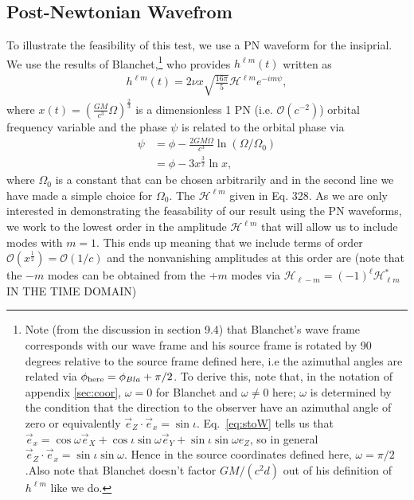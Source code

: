 \documentclass[aps,prd,amsmath,showpacs,amssymb,superscriptaddress,nofootinbib,longbibliography,eqsecnum,preprintnumbers]{revtex4-1}
\begin{document}
\subsection{Post-Newtonian Wavefrom}
To illustrate the feasibility of this test, we use a PN waveform for the insiprial.
We use the results of Blanchet,\footnote{Note (from the discussion in section 9.4) that Blanchet's wave frame corresponds with our wave frame and his source frame is rotated by 90 degrees relative to the source frame defined here, i.e the azimuthal angles are related via $\phi_{\rm here} =\phi_{Bla}+\pi/2$. To derive this, note that, in the notation of appendix \ref{sec:coor}, $\omega =0$ for Blanchet and $\omega\neq 0$ here; $\omega$ is determined by the condition that the direction to the observer have an azimuthal angle of zero or equivalently $\vec e_Z \cdot \vec e_x =\sin \iota$. Eq.~\eqref{eq:stoW} tells us that $\vec e_x =\cos \omega \vec e_X +\cos \iota \sin\omega \vec e_Y +\sin \iota \sin \omega e_Z$, so in general $\vec e_Z \cdot \vec e_x =\sin\iota \sin\omega$. Hence in the source coordinates defined here, $\omega =\pi/2$.Also note that Blanchet doesn't factor $GM/(c^2d)$ out of his definition of $h^{\ell m}$ like we do.}  
who provides $h^{\ell m}(t)$ written as
\begin{align}
h^{\ell m}(t)=2\nu x\sqrt{\frac{16\pi}{5}}\mathcal{H}^{\ell m}e^{-im\psi},
\end{align}
where $x(t)=\left(\frac{GM}{c^3}\Omega\right)^\frac{2}{3}$ is a dimensionless 1 PN (i.e. $\mathcal{O}(c^{-2})$) orbital frequency variable and the phase $\psi$ is related to the orbital phase via
\begin{align}
\psi&=\phi-\frac{2GM\Omega}{c^3}\ln(\Omega/\Omega_0) \nonumber \\
&=\phi-3x^\frac{3}{2}\ln x, \label{eq:pha}
\end{align}
where $\Omega_0$ is a constant that can be chosen arbitrarily and in the second line we have made a simple choice for $\Omega_0$.
The $\mathcal{H}^{\ell m}$ given in Eq. 328. As we are only interested in demonstrating the feasability of our result using the PN waveforms, we work to the lowest order in the amplitude $\mathcal{H}^{\ell m}$ that will allow us to include modes with $m=1$. This ends up meaning that we include terms of order $\mathcal{O}(x^\frac{1}{2})=\mathcal{O}(1/c)$ and the nonvanishing amplitudes at this order are (note that the $-m$ modes can be obtained from the $+m$ modes via $\mathcal{H}_{\ell -m}=(-1)^\ell \mathcal{H}_{\ell m}^*$ IN THE TIME DOMAIN)
\end{document}
